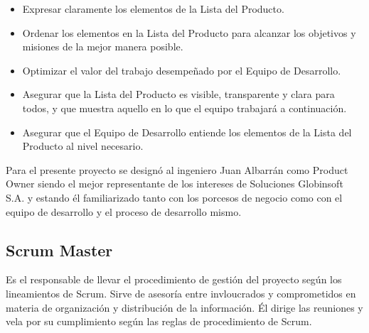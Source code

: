         \begin{itemize}
            \item Expresar claramente los elementos de la Lista del Producto.
            \item Ordenar los elementos en la Lista del Producto para alcanzar los objetivos y misiones de la mejor manera posible.
            \item Optimizar el valor del trabajo desempeñado por el Equipo de Desarrollo.
            \item Asegurar que la Lista del Producto es visible, transparente y clara para todos, y que muestra aquello en lo que el equipo trabajará a continuación.
            \item Asegurar que el Equipo de Desarrollo entiende los elementos de la Lista del Producto al nivel necesario.
        \end{itemize}
               
        Para el presente proyecto se designó al ingeniero Juan Albarrán como Product Owner siendo el mejor representante de los intereses de Soluciones Globinsoft S.A. y estando él familiarizado tanto con los porcesos de negocio como con el equipo de desarrollo y el proceso de desarrollo mismo.
        
        \subsection{Scrum Master}
        \label{scrum-master}
        
        Es el responsable de llevar el procedimiento de gestión del proyecto según los lineamientos de Scrum. Sirve de asesoría entre invloucrados y comprometidos en materia de organización y distribución de la información. Él dirige las reuniones y vela por su cumplimiento según las reglas de procedimiento de Scrum.
        

